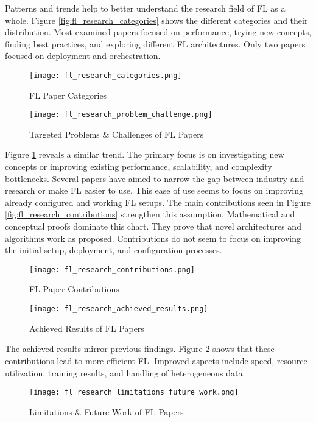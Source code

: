 Patterns and trends help to better understand the research field of FL as a whole.
Figure \ref{fig:fl_research_categories} shows the different categories and their distribution.
Most examined papers focused on performance, trying new concepts, finding best practices, and exploring different FL architectures.
Only two papers focused on deployment and orchestration.

\begin{figure}[p]
    \centering
    \texttt{[image: fl\_research\_categories.png]}
    \caption{FL Paper Categories}
    \label{fig:fl_research_categories}

    \texttt{[image: fl\_research\_problem\_challenge.png]}
    \caption{Targeted Problems \& Challenges of FL Papers}
    \label{fig:fl_research_problem_challenge}
\end{figure}

Figure \ref{fig:fl_research_problem_challenge} reveals a similar trend.
The primary focus is on investigating new concepts or improving existing performance, scalability, and complexity bottlenecks.
Several papers have aimed to narrow the gap between industry and research or make FL easier to use.
This ease of use seems to focus on improving already configured and working FL setups.
The main contributions seen in Figure \ref{fig:fl_research_contributions} strengthen this assumption.
Mathematical and conceptual proofs dominate this chart.
They prove that novel architectures and algorithms work as proposed.
Contributions do not seem to focus on improving the initial setup, deployment, and configuration processes.

\begin{figure}[p]
    \centering
    \texttt{[image: fl\_research\_contributions.png]}
    \caption{FL Paper Contributions}
    \label{fig:fl_research_contributions}

    \texttt{[image: fl\_research\_achieved\_results.png]}
    \caption{Achieved Results of FL Papers}
    \label{fig:fl_research_achieved_results}
\end{figure}

The achieved results mirror previous findings.
Figure \ref{fig:fl_research_achieved_results} shows that these contributions lead to more efficient FL.
Improved aspects include speed, resource utilization, training results, and handling of heterogeneous data.

\begin{figure}[h]
    \centering
    \texttt{[image: fl\_research\_limitations\_future\_work.png]}
    \caption{Limitations \& Future Work of FL Papers}
    \label{fig:fl_research_limitations_future_work}
\end{figure}

